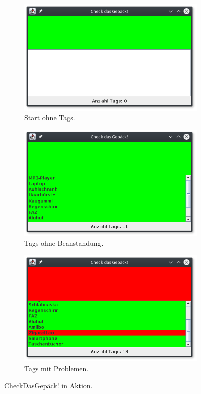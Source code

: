 \documentclass[paper=a4,fontsize=11pt,headsepline,footsepline,parskip=half]{scrartcl}
\begin{document}
\begin{figure}[th]
  \centering
  \begin{subfigure}[t]{.3\linewidth}
    \includegraphics[width=.95\linewidth]{screenshot0}
    \caption{Start ohne Tags.}
    \label{fig:start}
  \end{subfigure}%
  \hfill
  \begin{subfigure}[t]{.3\linewidth}
    \includegraphics[width=.95\linewidth]{screenshot1}
    \caption{Tags ohne Beanstandung.}
    \label{fig:green}
  \end{subfigure}
  \hfill
  \begin{subfigure}[t]{.3\linewidth}
    \includegraphics[width=.95\linewidth]{screenshot2}
    \caption{Tags mit Problemen.}
    \label{fig:red}
  \end{subfigure}%
  \caption{CheckDasGepäck! in Aktion.}
  \label{fig:app}
\end{figure}
\end{document}
